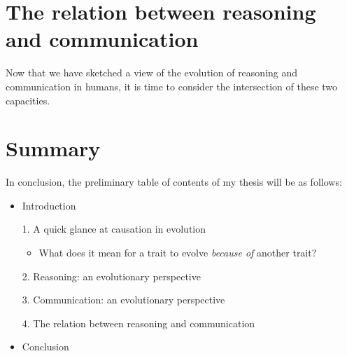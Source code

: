 \documentclass{article}
\begin{document}
\section{The relation between reasoning and communication}

Now that we have sketched a view of the evolution of reasoning and communication in humans, it is time to consider the intersection of these two capacities.

\section*{Summary}

In conclusion, the preliminary table of contents of my thesis will be as follows:
\begin{itemize}
    \item Introduction
    \item[1.] A quick glance at causation in evolution
        \begin{itemize}
            \item What does it mean for a trait to evolve \emph{because of} another trait?
        \end{itemize}
    \item [2.] Reasoning: an evolutionary perspective
    \item [3.] Communication: an evolutionary perspective
    \item [4.] The relation between reasoning and communication
    \item Conclusion
\end{itemize}

\nocite{*}
\printbibliography[title=Preliminary bibliography]
\end{document}
